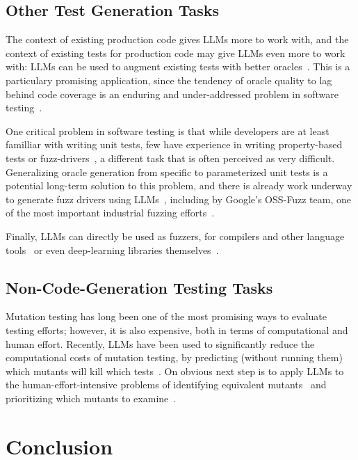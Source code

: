 \documentclass[sigconf,natbib=false]{acmart}
\begin{document}
\subsection{Other Test Generation Tasks}

The context of existing production code gives LLMs more to work with,
and the context of existing tests for production code may give LLMs
even more to work with: LLMs can be used to augment existing tests
with better oracles~\cite{OracleGEN}.  This is a particulary promising
application, since the tendency of oracle quality to lag behind code coverage
is an enduring and under-addressed problem in software testing~\cite{MindGap}.

One critical problem in software testing is that while developers are
at least familliar with writing unit tests, few have experience in
writing property-based tests or fuzz-drivers~\cite{goldstein2022some}, a different task
that is often perceived as very difficult.  Generalizing oracle
generation from specific to parameterized unit tests is a potential
long-term solution to this problem, and there is already work underway
to generate fuzz drivers using LLMs~\cite{zhang2023understanding},
including by Google's OSS-Fuzz team, one of the most important
industrial fuzzing efforts~\cite{ossfuzzllm}.

Finally, LLMs can directly be used as fuzzers, for compilers and other
language tools~\cite{xia2023universal} or even
deep-learning libraries themselves~\cite{LLMFuzz}.

\subsection{Non-Code-Generation Testing Tasks}

Mutation testing has long been one of the most promising ways to
evaluate testing efforts; however, it is also expensive, both in terms
of computational and human effort.  Recently, LLMs have been used to
significantly reduce the computational costs of mutation testing, by
predicting (without running them) which mutants will kill which
tests~\cite{ContextPMT}.  On obvious next step is to apply LLMs to the
human-effort-intensive problems of identifying equivalent
mutants~\cite{TCE} and prioritizing which mutants to examine~\cite{StatMut}.

\section{Conclusion}
\end{document}
